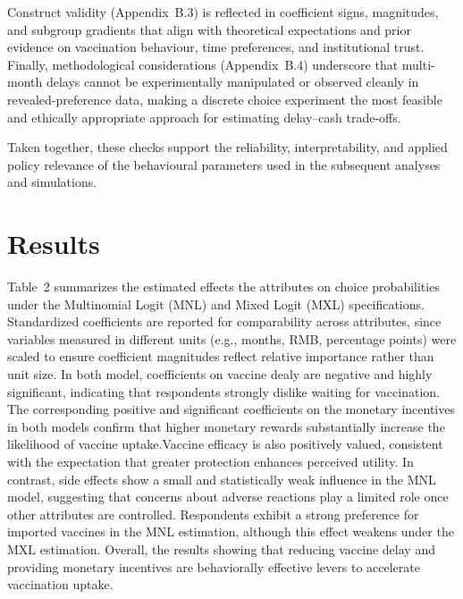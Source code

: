 \documentclass[12pt]{article}
\begin{document}
Construct validity (Appendix~B.3) is reflected in coefficient signs, magnitudes, and subgroup
gradients that align with theoretical expectations and prior evidence on vaccination
behaviour, time preferences, and institutional trust. Finally, methodological considerations
(Appendix~B.4) underscore that multi-month delays cannot be experimentally manipulated or
observed cleanly in revealed-preference data, making a discrete choice experiment the most
feasible and ethically appropriate approach for estimating delay--cash trade-offs.

Taken together, these checks support the reliability, interpretability, and applied policy
relevance of the behavioural parameters used in the subsequent analyses and simulations.






\clearpage

\section{Results}

Table~2 summarizes the estimated effects the attributes on choice probabilities under the Multinomial Logit (MNL) and Mixed Logit (MXL) specifications. Standardized coefficients are reported for comparability across attributes, since variables measured in different units (e.g., months, RMB, percentage points) were scaled to ensure coefficient magnitudes reflect relative importance rather than unit size. In both model, coefficients on vaccine dealy are negative and highly significant, indicating that respondents strongly dislike waiting for vaccination.
 The corresponding positive and significant coefficients on the monetary incentives in both models confirm that higher monetary rewards substantially increase the likelihood of vaccine uptake.Vaccine efficacy is also positively valued, consistent with the expectation that greater protection enhances perceived utility. In contrast, side effects show a small and statistically weak influence in the MNL model, suggesting that concerns about adverse reactions play a limited role once other attributes are controlled. Respondents exhibit a strong preference for imported vaccines in the MNL estimation, although this effect weakens under the MXL estimation. Overall, the results showing that reducing vaccine delay and providing monetary incentives are behaviorally effective levers to accelerate vaccination uptake.
\end{document}
